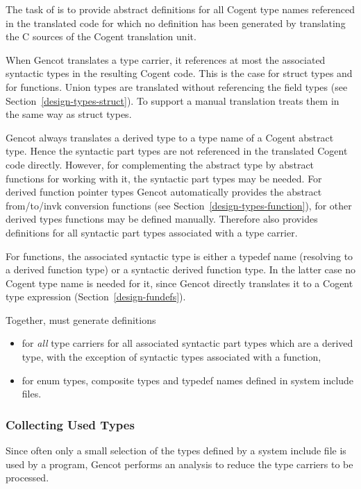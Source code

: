 The task of  is to provide abstract definitions for all Cogent type names referenced 
in the translated code for which
no definition has been generated by translating the C sources of the Cogent translation unit.

When Gencot translates a type carrier, it references at most the associated syntactic types in the resulting Cogent code.
This is the case for struct types and for functions. Union types are translated without referencing the field types
(see Section~\ref{design-types-struct}). To support a manual translation  treats them in 
the same way as struct types.

Gencot always translates a derived type to a type name of a Cogent abstract type. Hence the syntactic part types are 
not referenced in the translated Cogent code directly. However, for complementing the abstract type by abstract
functions for working with it, the syntactic part types may be needed. For derived function pointer types Gencot automatically
provides the abstract from/to/invk conversion functions (see Section~\ref{design-types-function}), for other derived 
types functions may be defined manually. Therefore  also provides definitions for all syntactic
part types associated with a type carrier.

For functions, the associated syntactic type is either a typedef name (resolving to a derived function type) 
or a syntactic derived function type. In the latter case no Cogent type name is needed for it, since Gencot
directly translates it to a Cogent type expression (Section~\ref{design-fundefs}). 

Together,  must generate definitions
\begin{itemize}
\item for \textit{all} type carriers for all associated syntactic part types which are a derived type,
with the exception of syntactic types associated with a function,
\item for enum types, composite types and typedef names defined in system include files.
\end{itemize}

\subsubsection{Collecting Used Types}

Since often only a small selection of the types defined by a system include file is used by a program, Gencot performs 
an analysis to reduce the type carriers to be processed. 

